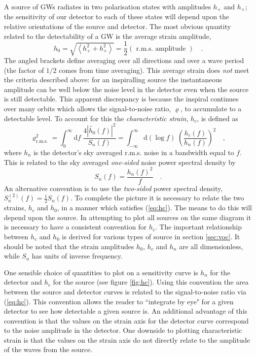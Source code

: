 A source of GWs radiates in two polarisation states with amplitudes $h_{+}$ and $h_{\times}$; the sensitivity of our detector to each of these states will depend upon the relative orientations of the source and detector. The most obvious quantity related to the detectability of a GW is the average strain amplitude,
\begin{equation}\label{eq:h0} h_{0}=\sqrt{\left< h_{+}^{2}+h_{\times}^{2} \right>}=\frac{1}{2}\left( \textrm{ r.m.s. amplitude } \right) \quad.\end{equation}
The angled brackets define averaging over all directions and over a wave period (the factor of $1/2$ comes from time averaging). This average strain does \emph{not} meet the criteria described above: for an inspiralling source the instantaneous amplitude can be well below the noise level in the detector even when the source is still detectable. This apparent discrepancy is because the inspiral continues over many orbits which allows the signal-to-noise ratio, $\varrho$, to accumulate to a detectable level. To account for this the \emph{characteristic strain}, $h_{c}$, is defined as
\begin{equation}\label{eq:hc} 
\varrho_{\textrm{r.m.s.}}^{2}= \int_{0}^{\infty}\textrm{d}f\; \frac{4\left|\tilde{h_{0}}(f)\right|^{2}}{S_{n}(f)} =\int_{-\infty}^{\infty} \textrm{d}\left(\log f\right)\; \left(\frac{h_{c}(f)}{h_{n}(f)}\right)^{2} \quad,
\end{equation}
where $h_{n}$ is the detector's sky averaged r.m.s. noise in a bandwidth equal to $f$. This is related to the sky averaged \emph{one-sided} noise power spectral density by
\begin{equation}\label{eq:powerspectraldensity} S_{n}(f)=\frac{h_{n}(f)^{2}}{f} \quad . \end{equation}
An alternative convention is to use the \emph{two-sided} power spectral density, $S^{(2)}_{n}(f)=\frac{1}{2}S_{n}(f)$. To complete the picture it is necessary to relate the two strains, $h_{c}$ and $h_{0}$, in a manner which satisfies (\ref{eq:hc}). The means to do this will depend upon the source. In attempting to plot all sources on the same diagram it is necessary to have a consistent convention for $h_{c}$. The important relationship between $h_{c}$ and $h_{0}$ is derived for various types of source in section \ref{sec:voc}. It should be noted that the strain amplitudes $h_{0}$, $h_{c}$ and $h_{n}$ are all dimensionless, while $S_{n}$ has units of inverse frequency. 

One sensible choice of quantities to plot on a sensitivity curve is $h_{n}$ for the detector and $h_{c}$ for the source (see figure \ref{fig:hc}). Using this convention the area between the source and detector curves is related to the signal-to-noise ratio via (\ref{eq:hc}). This convention allows the reader to ``integrate by eye" for a given detector to see how detectable a given source is. An additional advantage of this convention is that the values on the strain axis for the detector curve correspond to the noise amplitude in the detector. One downside to plotting characteristic strain is that the values on the strain axis do not directly relate to the amplitude of the waves from the source.


